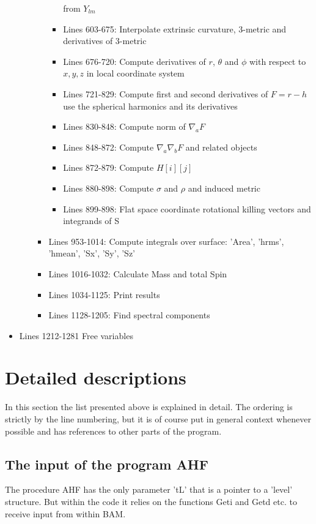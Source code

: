 \documentclass[11pt,a4paper,twoside]{article}
\begin{document}
\begin{itemize}
\begin{itemize}
\begin{itemize}
\begin{itemize}
                               from $Y_{lm}$
        \item {Lines 603-675:} Interpolate extrinsic curvature, 3-metric and 
            derivatives of 3-metric
        \item {Lines 676-720:} Compute derivatives of $r$, $\theta$ and $\phi$ 
          with respect to $x,y,z$ in local coordinate system
        \item {Lines 721-829:} Compute first and second derivatives of $F=r-h$
                  use the spherical harmonics and its derivatives
        \item {Lines 830-848:} Compute norm of $\nabla_a F$
        \item {Lines 848-872:} Compute $\nabla_a \nabla_b F$ and related objects
        \item {Lines 872-879:} Compute $H[i][j]$
        \item {Lines 880-898:} Compute $\sigma$ and $\rho$ and induced metric
        \item {Lines 899-898:} Flat space coordinate rotational killing vectors
                               and integrands of S
      \end{itemize}
      \item {Lines 953-1014:} Compute integrals over surface: 'Area', 'hrms',
                              'hmean', 'Sx', 'Sy', 'Sz'
      \item {Lines 1016-1032:} Calculate Mass and total Spin
      \item {Lines 1034-1125:} Print results
      \item {Lines 1128-1205:} Find spectral components
    \end{itemize}
  \end{itemize}
  \item {Lines 1212-1281} Free variables
\end{itemize}
%
%
\section{Detailed descriptions}
In this section the list presented above is explained in detail. The ordering
is strictly by the line numbering, but it is of course put in general context
whenever possible and has references to other parts of the program.

\subsection{The input of the program AHF}
The procedure AHF has the only parameter 'tL' that is a pointer to a 'level' 
structure. But within the code it relies on the functions Geti and Getd etc.
to receive input from within BAM. 
\end{document}
